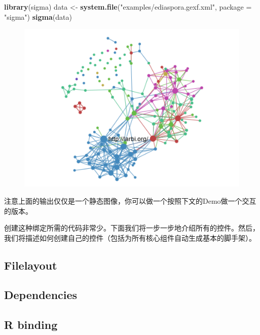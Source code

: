 \documentclass[]{book}
\newenvironment{Shaded}{\begin{snugshade}}{\end{snugshade}}
\newcommand{\KeywordTok}[1]{\textcolor[rgb]{0.13,0.29,0.53}{\textbf{#1}}}
\newcommand{\DataTypeTok}[1]{\textcolor[rgb]{0.13,0.29,0.53}{#1}}
\newcommand{\StringTok}[1]{\textcolor[rgb]{0.31,0.60,0.02}{#1}}
\newcommand{\NormalTok}[1]{#1}
\theoremstyle{definition}
\theoremstyle{definition}
\theoremstyle{definition}
\theoremstyle{remark}
\begin{document}
\begin{Shaded}
\begin{Highlighting}[]
\KeywordTok{library}\NormalTok{(sigma)}
\NormalTok{data <-}\StringTok{ }\KeywordTok{system.file}\NormalTok{(}\StringTok{"examples/ediaspora.gexf.xml"}\NormalTok{, }\DataTypeTok{package =} \StringTok{"sigma"}\NormalTok{)}
\KeywordTok{sigma}\NormalTok{(data)}
\end{Highlighting}
\end{Shaded}

\begin{figure}
\centering
\includegraphics{_bookdown_files/htmlwidgets_cn_files/figure-html/ch1_1.png}
\caption{}
\end{figure}

注意上面的输出仅仅是一个静态图像，你可以做一个按照下文的Demo做一个交互的版本。

创建这种绑定所需的代码非常少。下面我们将一步一步地介绍所有的控件。然后，我们将描述如何创建自己的控件（包括为所有核心组件自动生成基本的脚手架）。

\subsection{Filelayout}\label{filelayout}

\subsection{Dependencies}\label{dependencies}

\subsection{R binding}\label{r-binding}
\end{document}
